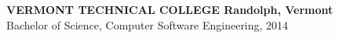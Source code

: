 


\begin{cvparagraph}

{\normalsize \textbf{ VERMONT TECHNICAL COLLEGE \hfill Randolph, Vermont}} \\
Bachelor of Science, Computer Software Engineering, 2014

\end{cvparagraph}
